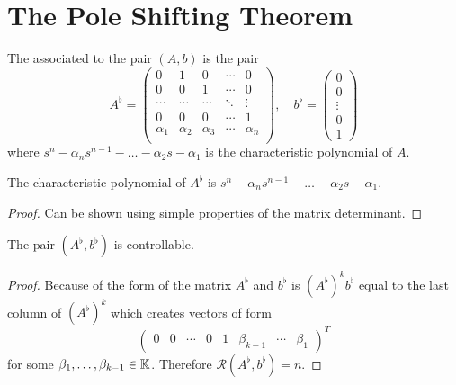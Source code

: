 \chapter{The Pole Shifting Theorem}

\begin{definition}
    The  associated to the pair $(A,b)$ is the pair 
    \begin{equation*}
        A^\flat=
        \begin{pmatrix}
            0 & 1 & 0 & \cdots & 0 \\
            0 & 0 & 1 & \cdots & 0 \\
            \cdots & \cdots & \cdots & \ddots & \vdots \\
            0 & 0 & 0 & \cdots & 1 \\
            \alpha_1 & \alpha_2 & \alpha_3 & \cdots & \alpha_n \\
        \end{pmatrix},
        \quad
        b^\flat=
        \begin{pmatrix}
            0 \\
            0 \\
            \vdots \\
            0 \\
            1
        \end{pmatrix}
    \end{equation*}
    where $s^n-\alpha_ns^{n-1}-\ldots-\alpha_2s-\alpha_1$ is the characteristic polynomial of $A$.
\end{definition}

\begin{lemma}
\label{lem:flatCharPol}
    The characteristic polynomial of $A^\flat$ is $s^n-\alpha_ns^{n-1}-\ldots-\alpha_2s-\alpha_1$.
\end{lemma}

\begin{proof}
    Can be shown using simple properties of the matrix determinant.
\end{proof}

\begin{lemma}
\label{lem:flatControllable}
    The pair $(A^\flat,b^\flat)$ is controllable.
\end{lemma}

\begin{proof}
    Because of the form of the matrix $A^\flat$ and $b^\flat$ is $(A^\flat)^kb^\flat$ equal to the last column of $(A^\flat)^k$ which creates vectors of form 
    \begin{equation*}
        \begin{pmatrix}
            0 &
            0 &
            \cdots &
            0 &
            1 &
            \beta_{k-1} &
            \cdots &
            \beta_1
        \end{pmatrix}^T
    \end{equation*}
    for some $\beta_1,\ldots,\beta_{k-1}\in\mathbb{K}$. Therefore $\mathcal{R}(A^\flat,b^\flat)=n$.
\end{proof}

